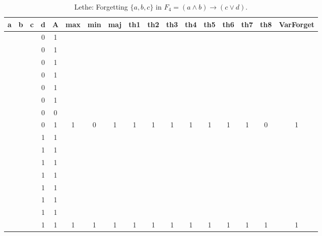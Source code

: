 \begin{table}[!tb]
    \centering
    \begin{tabular}{|c|c|c|c|c|c|c|c|c|c|c|c|c|c|c|c|c|}
        \hline
        \textbf{a} & \textbf{b} & \textbf{c} & \textbf{d} & \textbf{A} & \textbf{max} & \textbf{min} & \textbf{maj} & \textbf{th1} & \textbf{th2} & \textbf{th3} & \textbf{th4} & \textbf{th5} & \textbf{th6} & \textbf{th7} & \textbf{th8} & \textbf{VarForget} \\ \hline
        \rowcolor{gray!40}  &  &  & 0 & 1 &  &  &  &  &  &  &  &  &  &  &  &  \\ \hline
        \rowcolor{gray!40}  &  &  & 0 & 1 &  &  &  &  &  &  &  &  &  &  &  &  \\ \hline
        \rowcolor{gray!40}  &  &  & 0 & 1 &  &  &  &  &  &  &  &  &  &  &  &  \\ \hline
        \rowcolor{gray!40}  &  &  & 0 & 1 &  &  &  &  &  &  &  &  &  &  &  &  \\ \hline
        \rowcolor{gray!40}  &  &  & 0 & 1 &  &  &  &  &  &  &  &  &  &  &  &  \\ \hline
        \rowcolor{gray!40}  &  &  & 0 & 1 &  &  &  &  &  &  &  &  &  &  &  &  \\ \hline
        \rowcolor{gray!40}  &  &  & 0 & 0 &  &  &  &  &  &  &  &  &  &  &  &  \\ \hline
        \rowcolor{gray!40}  &  &  & 0 & 1 & 1 & 0 & 1 & 1 & 1 & 1 & 1 & 1 & 1 & 1 & 0 & 1 \\ \hline
        \rowcolor{blue!40}  &  &  & 1 & 1 &  &  &  &  &  &  &  &  &  &  &  &  \\ \hline
        \rowcolor{blue!40}  &  &  & 1 & 1 &  &  &  &  &  &  &  &  &  &  &  &  \\ \hline
        \rowcolor{blue!40}  &  &  & 1 & 1 &  &  &  &  &  &  &  &  &  &  &  &  \\ \hline
        \rowcolor{blue!40}  &  &  & 1 & 1 &  &  &  &  &  &  &  &  &  &  &  &  \\ \hline
        \rowcolor{blue!40}  &  &  & 1 & 1 &  &  &  &  &  &  &  &  &  &  &  &  \\ \hline
        \rowcolor{blue!40}  &  &  & 1 & 1 &  &  &  &  &  &  &  &  &  &  &  &  \\ \hline
        \rowcolor{blue!40}  &  &  & 1 & 1 &  &  &  &  &  &  &  &  &  &  &  &  \\ \hline
        \rowcolor{blue!40}  &  &  & 1 & 1 & 1 & 1 & 1 & 1 & 1 & 1 & 1 & 1 & 1 & 1 & 1 & 1 \\ \hline
    \end{tabular}
    \caption{Lethe: Forgetting $\{a, b, c\}$ in $F_{4} = (a \land b) \rightarrow (c \lor d)$.}
    \label{tab:lethe-F4-abc}
\end{table}
